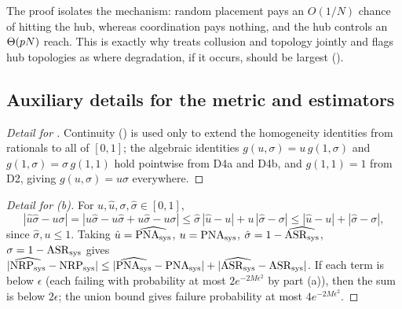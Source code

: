 \begin{remark}
The proof isolates the mechanism: random placement pays an $O(1/N)$ chance of hitting the
hub, whereas coordination pays nothing, and the hub controls an $\Theta(p N)$ reach. This
is exactly why  treats collusion and topology jointly and flags hub topologies as
where degradation, if it occurs, should be largest ().
\end{remark}

\subsection{Auxiliary details for the metric and estimators}

\begin{proof}[Detail for ]
Continuity () is used only to extend the homogeneity identities from rationals
to all of $[0,1]$; the algebraic identities $g(u,\sigma)=u\,g(1,\sigma)$ and
$g(1,\sigma)=\sigma\,g(1,1)$ hold pointwise from D4a and D4b, and $g(1,1)=1$ from D2, giving
$g(u,\sigma)=u\sigma$ everywhere.
\end{proof}

\begin{proof}[Detail for (b)]
For $u,\hat u,\sigma,\hat\sigma\in[0,1]$,
\[
|\hat u\hat\sigma-u\sigma|
=|\hat u\hat\sigma-u\hat\sigma+u\hat\sigma-u\sigma|
\le \hat\sigma\,|\hat u-u|+u\,|\hat\sigma-\sigma|
\le |\hat u-u|+|\hat\sigma-\sigma|,
\]
since $\hat\sigma,u\le1$. Taking $\hat u=\widehat{\mathrm{PNA}_{\mathrm{sys}}}$, $u=\mathrm{PNA}_{\mathrm{sys}}$,
$\hat\sigma=1-\widehat{\mathrm{ASR}_{\mathrm{sys}}}$, $\sigma=1-\mathrm{ASR}_{\mathrm{sys}}$ gives
$|\widehat{\mathrm{NRP}_{\mathrm{sys}}}-\mathrm{NRP}_{\mathrm{sys}}|\le|\widehat{\mathrm{PNA}_{\mathrm{sys}}}-\mathrm{PNA}_{\mathrm{sys}}|+|\widehat{\mathrm{ASR}_{\mathrm{sys}}}-\mathrm{ASR}_{\mathrm{sys}}|$. If each term is
below $\epsilon$ (each failing with probability at most $2e^{-2M\epsilon^2}$ by part (a)),
then the sum is below $2\epsilon$; the union bound gives failure probability at most
$4e^{-2M\epsilon^{2}}$.
\end{proof}
